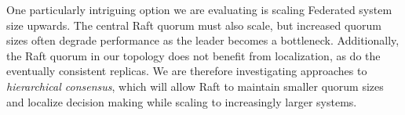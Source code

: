 \documentclass[10pt,conference,letterpaper]{IEEEtran}
\begin{document}
One particularly intriguing option we are evaluating is scaling Federated
system
size upwards.
The central Raft quorum must also scale, but increased quorum sizes often degrade
performance as the leader becomes a bottleneck.
Additionally, the Raft quorum in our topology does not benefit from
localization, as do the eventually consistent replicas.
We are therefore investigating
approaches to \emph{hierarchical consensus}, which will allow Raft to maintain
smaller quorum sizes and localize decision making while scaling to
increasingly larger systems.

%



\end{document}
